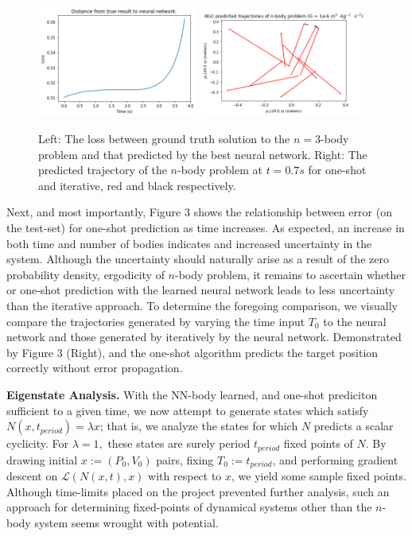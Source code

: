 \documentclass{article}
\numberwithin{theorem}{section}
\numberwithin{equation}{section}
\def\scriptl{{\mathcal L}}
\begin{document}
\begin{figure}
	\begin{center}
		\includegraphics[width=0.47\textwidth]{download.png}
		\includegraphics[width=0.49\textwidth]{predicted.png}
	\end{center}
	\caption{Left: The loss between ground truth solution to the $n=3$-body problem and that predicted by the best neural network. Right: The predicted trajectory
	of the $n$-body problem at $t=0.7s$ for one-shot and iterative, red and black respectively.}
\end{figure}
 Next, and most importantly, Figure 3 shows the relationship between error (on the test-set) for one-shot prediction as time increases. As expected, an increase in both time and number of bodies indicates and increased uncertainty in the system. Although the uncertainty should naturally arise as a result of the zero probability density, ergodicity of $n$-body problem, it remains to ascertain whether or one-shot prediction with the learned neural network leads to less uncertainty than the iterative approach. To determine the foregoing comparison, we visually compare the trajectories generated by varying the time input $T_0$ to the neural network and those generated by iteratively by the neural network. Demonstrated by Figure 3 (Right), and the one-shot algorithm predicts the target position correctly without error propagation.

 \textbf{Eigenstate Analysis. } With the NN-body learned, and one-shot prediciton sufficient to a given time, we now attempt to generate states which satisfy $N(x, t_{period}) = \lambda x$; that is, we analyze the states for which $N$ predicts a scalar cyclicity. For $\lambda =1,$ these states are surely period $t_{period}$ fixed points of $N$. By drawing initial $x:=(P_0, V_0)$ pairs, fixing $T_0:=t_{period}$, and performing gradient descent on $\scriptl(N(x,t), x)$ with respect to $x$, we yield some sample fixed points. Although time-limits placed on the project prevented further analysis, such an approach for determining fixed-points of dynamical systems other than the $n$-body system seems wrought with potential.	 
% 
% 
% 
% 
% 
% 
\end{document}
